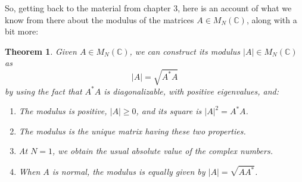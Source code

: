 \documentclass[12pt]{amsbook}
\newtheorem{theorem}{Theorem}[chapter]
\begin{document}
\bigskip

So, getting back to the material from chapter 3, here is an account of what we know from there about the modulus of the matrices $A\in M_N(\mathbb C)$, along with a bit more:


\begin{theorem}
Given $A\in M_N(\mathbb C)$, we can construct its modulus $|A|\in M_N(\mathbb C)$ as
$$|A|=\sqrt{A^*A}$$
by using the fact that $A^*A$ is diagonalizable, with positive eigenvalues, and:
\begin{enumerate}
\item The modulus is positive, $|A|\geq0$, and its square is $|A|^2=A^*A$.

\item The modulus is the unique matrix having these two properties.

\item At $N=1$, we obtain the usual absolute value of the complex numbers.

\item When $A$ is normal, the modulus is equally given by $|A|=\sqrt{AA^*}$.
\end{enumerate}
\end{theorem}
\end{document}
